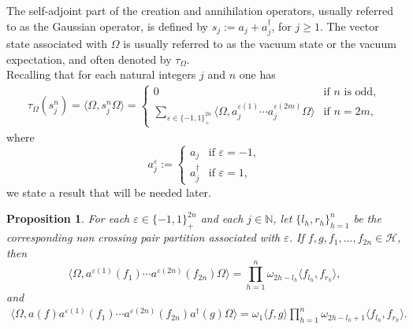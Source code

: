 \documentclass[12pt]{amsart}
\numberwithin{equation}{section}
\def\ch{{\mathcal H}}
\def\bn{{\mathbb N}}
\def\eps{\varepsilon}
\def\t{\tau}
\def\om{\omega} \def\Om{\Omega}
\newtheorem{prop}[thm]{Proposition}
\theoremstyle{definition}
\begin{document}
The self-adjoint part of the creation and annihilation operators, usually referred to as the Gaussian operator, is defined by $s_j := a_j + a_j^\dag$, for $j\geq 1$. The vector state associated with $\Om$ is usually referred to as the vacuum state or the vacuum expectation, and often denoted by $\t_\Om$.\\
Recalling that for each natural integers $j$ and $n$ one has
\begin{align}
\label{2ome01b}
\t_\Om(s_j^n)=\langle\Omega,s_j^n\Omega\rangle
=
\begin{cases}
0 & \text{if $n$ is odd},\\
\displaystyle
\sum_{\eps\in\{-1,1\}^{2n}_+}
\langle\Omega,
a_j^{\eps(1)}\cdots a_j^{\eps(2m)}\Omega\rangle
& \text{if $n=2m$},
\end{cases}
\end{align}
where
\begin{equation*}
a_j^\eps :=
\begin{cases}
a_j & \text{if }\eps=-1,\\
a_j^\dag & \text{if }\eps=1,
\end{cases}
\end{equation*}
we state a result that will be needed later.
\begin{prop}
\label{moment1}
For each $\eps\in\{-1,1\}^{2n}_+$ and each $j\in\bn$, let $\{l_h,r_h\}_{h=1}^n$ be the corresponding non crossing pair partition associated with $\eps$. If $f,g,f_1,\ldots, f_{2n}\in\ch$, then
\begin{equation}
\label{2ome02a}
\langle\Omega,
a^{\eps(1)}(f_1)\cdots a^{\eps(2n)}(f_{2n})\Omega\rangle
=
\prod_{h=1}^n \om_{2h-l_h}\langle f_{l_h},f_{r_h}\rangle,
\end{equation}
and
\begin{align}
\label{2ome02b}
\langle\Omega,
a(f) a^{\eps(1)}(f_1)\cdots a^{\eps(2n)}(f_{2n}) a^\dag(g) \Omega\rangle
=
\om_1\langle f,g\rangle \prod_{h=1}^n \om_{2h-l_h+1}\langle f_{l_h},f_{r_h}\rangle.
\end{align}
\end{prop}
\end{document}
